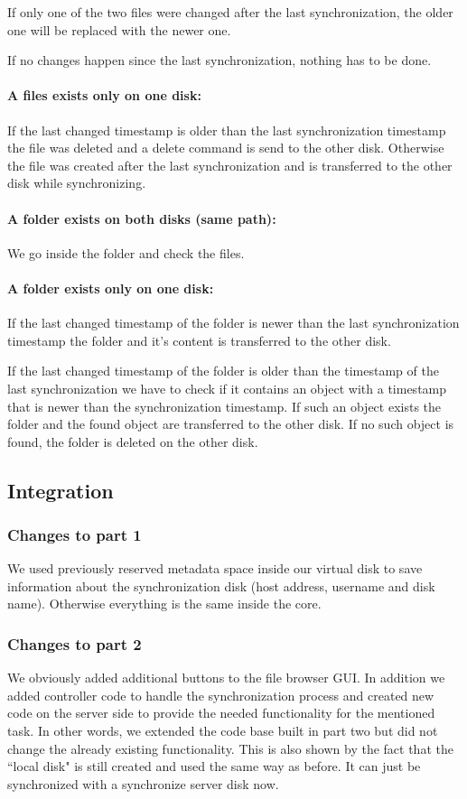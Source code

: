 \documentclass[a4paper,12pt]{article}
\begin{document}
If only one of the two files were changed after the last synchronization, the older one will be replaced with the newer one.

If no changes happen since the last synchronization, nothing has to be done.

\paragraph{A files exists only on one disk:} If the last changed timestamp is older than the last synchronization timestamp the file was deleted and a delete command is send to the other disk. Otherwise the file was created after the last synchronization and is transferred to the other disk while synchronizing.

\paragraph{A folder exists on both disks (same path):} We go inside the folder and check the files.

\paragraph{A folder exists only on one disk:} If the last changed timestamp of the folder is newer than the last synchronization timestamp the folder and it's content is transferred to the other disk.

If the last changed timestamp of the folder is older than the timestamp of the last synchronization we have to check if it contains an object with a timestamp that is newer than the synchronization timestamp. If such an object exists the folder and the found object are transferred to the other disk. If no such object is found, the folder is deleted on the other disk.

\subsection{Integration}
\subsubsection{Changes to part 1}
We used previously reserved metadata space inside our virtual disk to save information about the synchronization disk (host address, username and disk name). Otherwise everything is the same inside the core.

\subsubsection{Changes to part 2}
We obviously added additional buttons to the file browser GUI. In addition we added controller code to handle the synchronization process and created new code on the server side to provide the needed functionality for the mentioned task. In other words, we extended the code base built in part two but did not change the already existing functionality. This is also shown by the fact that the ``local disk" is still created and used the same way as before. It can just be synchronized with a synchronize server disk now.
\end{document}
